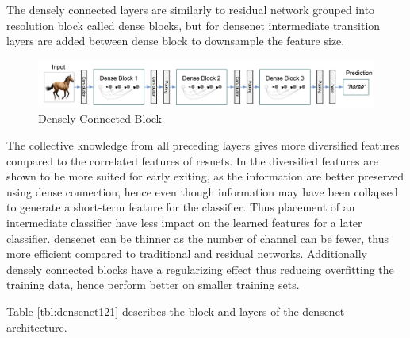 The densely connected layers are similarly to residual network grouped into resolution block called dense blocks, but for \gls{densenet} intermediate transition layers are added between dense block to downsample the feature size. 

\begin{figure}
	\centering
	\includegraphics[width=\linewidth]{figures/models/densenet}
	\caption[Densely Connected Block]{Densely Connected Block}
	\label{fig:densenet}
\end{figure}

The collective knowledge from all preceding layers gives more diversified features compared to the correlated features of \gls{resnet}s. In \cite{huang_multi-scale_2017} the diversified features are shown to be more suited for early exiting,  as the information are better preserved using dense connection, hence even though information may have been collapsed to generate a short-term feature for the classifier. Thus placement of an intermediate classifier have less impact on the learned features for a later classifier. \gls{densenet} can be thinner as the number of channel can be fewer, thus more efficient compared to traditional and residual networks. Additionally densely connected blocks have a regularizing effect thus reducing overfitting the training data, hence perform better on smaller training sets. 

Table \ref{tbl:densenet121} describes the block and layers of the \gls{densenet} architecture. 

